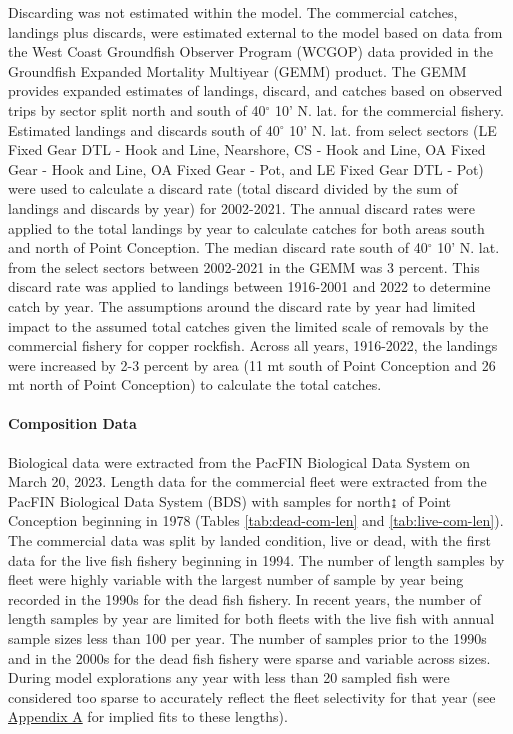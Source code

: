 \documentclass[11pt,
  english,
  letterpaper,
]{article}
\begin{document}
Discarding was not estimated within the model. The commercial catches, landings plus discards, were estimated external to the model based on data from the West Coast Groundfish Observer Program (WCGOP) data provided in the Groundfish Expanded Mortality Multiyear (GEMM) product. The GEMM provides expanded estimates of landings, discard, and catches based on observed trips by sector split north and south of 40\(^\circ\) 10' N. lat. for the commercial fishery. Estimated landings and discards south of 40\(^\circ\) 10' N. lat. from select sectors (LE Fixed Gear DTL - Hook and Line, Nearshore, CS - Hook and Line, OA Fixed Gear - Hook and Line, OA Fixed Gear - Pot, and LE Fixed Gear DTL - Pot) were used to calculate a discard rate (total discard divided by the sum of landings and discards by year) for 2002-2021. The annual discard rates were applied to the total landings by year to calculate catches for both areas south and north of Point Conception. The median discard rate south of 40\(^\circ\) 10' N. lat. from the select sectors between 2002-2021 in the GEMM was 3 percent. This discard rate was applied to landings between 1916-2001 and 2022 to determine catch by year. The assumptions around the discard rate by year had limited impact to the assumed total catches given the limited scale of removals by the commercial fishery for copper rockfish. Across all years, 1916-2022, the landings were increased by 2-3 percent by area (11 mt south of Point Conception and 26 mt north of Point Conception) to calculate the total catches.

\hypertarget{composition-data}{%
\paragraph{Composition Data}\label{composition-data}}

\hfill\break

Biological data were extracted from the PacFIN Biological Data System on March 20, 2023. Length data for the commercial fleet were extracted from the PacFIN Biological Data System (BDS) with samples for north↨ of Point Conception beginning in 1978 (Tables \ref{tab:dead-com-len} and \ref{tab:live-com-len}). The commercial data was split by landed condition, live or dead, with the first data for the live fish fishery beginning in 1994. The number of length samples by fleet were highly variable with the largest number of sample by year being recorded in the 1990s for the dead fish fishery. In recent years, the number of length samples by year are limited for both fleets with the live fish with annual sample sizes less than 100 per year. The number of samples prior to the 1990s and in the 2000s for the dead fish fishery were sparse and variable across sizes. During model explorations any year with less than 20 sampled fish were considered too sparse to accurately reflect the fleet selectivity for that year (see \protect\hyperlink{excluded-data}{Appendix A} for implied fits to these lengths).
\end{document}
